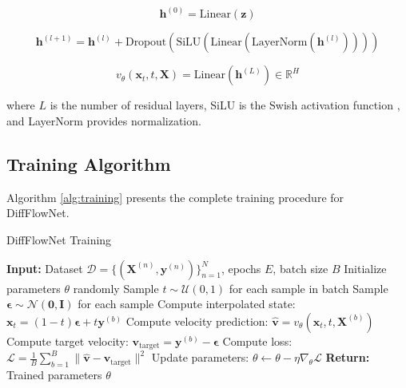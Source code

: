 \documentclass[11pt,a4paper]{article}
\begin{document}
\begin{equation}
    \mathbf{h}^{(0)} = \text{Linear}(\mathbf{z})
\end{equation}

\begin{equation}
    \mathbf{h}^{(l+1)} = \mathbf{h}^{(l)} + \text{Dropout}(\text{SiLU}(\text{Linear}(\text{LayerNorm}(\mathbf{h}^{(l)}))))
\end{equation}

\begin{equation}
    v_\theta(\mathbf{x}_t, t, \mathbf{X}) = \text{Linear}(\mathbf{h}^{(L)}) \in \mathbb{R}^H
\end{equation}

where $L$ is the number of residual layers, SiLU is the Swish activation function \cite{ramachandran2017swish}, and LayerNorm provides normalization.

\subsection{Training Algorithm}

Algorithm \ref{alg:training} presents the complete training procedure for DiffFlowNet.

\begin{algorithm}
\caption{DiffFlowNet Training}
\label{alg:training}
\begin{algorithmic}[1]
\STATE \textbf{Input:} Dataset $\mathcal{D} = \{(\mathbf{X}^{(n)}, \mathbf{y}^{(n)})\}_{n=1}^N$, epochs $E$, batch size $B$
\STATE Initialize parameters $\theta$ randomly
        \STATE Sample $t \sim \mathcal{U}(0,1)$ for each sample in batch
        \STATE Sample $\boldsymbol{\epsilon} \sim \mathcal{N}(\mathbf{0}, \mathbf{I})$ for each sample
        \STATE Compute interpolated state: $\mathbf{x}_t = (1-t)\boldsymbol{\epsilon} + t\mathbf{y}^{(b)}$
        \STATE Compute velocity prediction: $\hat{\mathbf{v}} = v_\theta(\mathbf{x}_t, t, \mathbf{X}^{(b)})$
        \STATE Compute target velocity: $\mathbf{v}_{\text{target}} = \mathbf{y}^{(b)} - \boldsymbol{\epsilon}$
        \STATE Compute loss: $\mathcal{L} = \frac{1}{B}\sum_{b=1}^B \|\hat{\mathbf{v}} - \mathbf{v}_{\text{target}}\|^2$
        \STATE Update parameters: $\theta \leftarrow \theta - \eta \nabla_\theta \mathcal{L}$
    \ENDFOR
\ENDFOR
\STATE \textbf{Return:} Trained parameters $\theta$
\end{algorithmic}
\end{algorithm}
\end{document}
